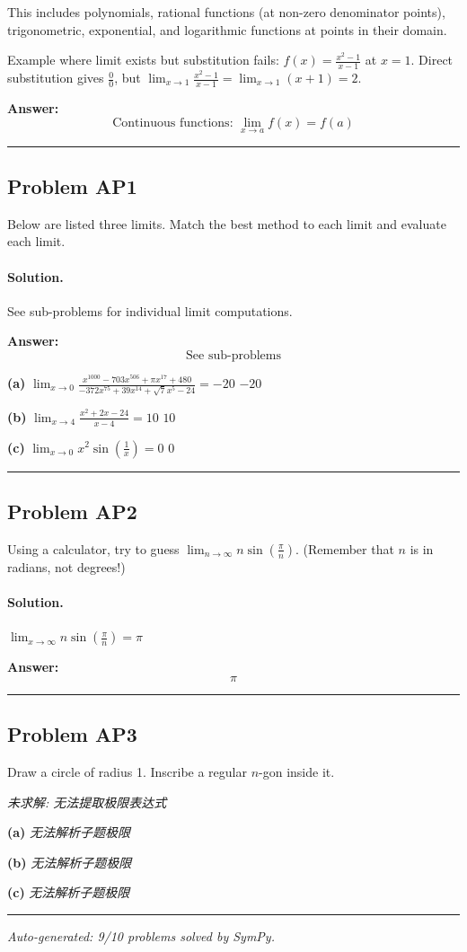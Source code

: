 \documentclass[12pt, a4paper]{article}
\newcommand{\problem}[1]{\subsection*{Problem #1}}
\newcommand{\solution}{\paragraph{Solution.}}
\begin{document}
This includes polynomials, rational functions (at non-zero denominator points), trigonometric, exponential, and logarithmic functions at points in their domain.

Example where limit exists but substitution fails: $f(x) = \frac{x^2 - 1}{x - 1}$ at $x = 1$. Direct substitution gives $\frac{0}{0}$, but $\lim_{x \to 1} \frac{x^2-1}{x-1} = \lim_{x \to 1}(x+1) = 2$.

\textbf{Answer:}
\[\boxed{\text{Continuous functions: } \lim_{x \to a} f(x) = f(a)}\]

\vspace{1em}
\hrule
\vspace{1em}

\problem{AP1}

Below are listed three limits. Match the best method to each limit and evaluate each limit.

\solution

See sub-problems for individual limit computations.

\textbf{Answer:}
\[\boxed{\text{See sub-problems}}\]

\textbf{(a)}
$\lim_{x \to 0} \frac{x^{1000} - 703 x^{506} + \pi x^{17} + 480}{- 372 x^{75} + 39 x^{14} + \sqrt{7} x^{5} - 24} = -20$
$\boxed{-20}$

\textbf{(b)}
$\lim_{x \to 4} \frac{x^{2} + 2 x - 24}{x - 4} = 10$
$\boxed{10}$

\textbf{(c)}
$\lim_{x \to 0} x^{2} \sin{\left(\frac{1}{x} \right)} = 0$
$\boxed{0}$

\vspace{1em}
\hrule
\vspace{1em}

\problem{AP2}

Using a calculator, try to guess $\lim_{n \to \infty} n \sin(\frac{\pi}{n})$. (Remember that $n$ is in radians, not degrees!)

\solution

$\lim_{x \to \infty} n \sin{\left(\frac{\pi}{n} \right)} = \pi$

\textbf{Answer:}
\[\boxed{\pi}\]

\vspace{1em}
\hrule
\vspace{1em}

\problem{AP3}

Draw a circle of radius 1. Inscribe a regular $n$-gon inside it.

\textit{\color{red} 未求解: 无法提取极限表达式}

\textbf{(a)}
\textit{\color{red} 无法解析子题极限}

\textbf{(b)}
\textit{\color{red} 无法解析子题极限}

\textbf{(c)}
\textit{\color{red} 无法解析子题极限}

\vspace{1em}
\hrule
\vspace{1em}


\vspace{2em}
\noindent\textit{Auto-generated: 9/10 problems solved by SymPy.}
\end{document}
